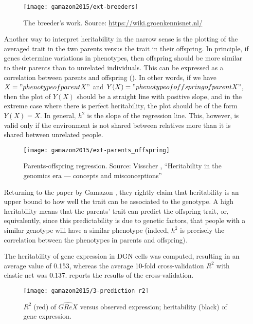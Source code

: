 \documentclass[../main.tex]{subfiles}
\begin{document}
\begin{figure}
	\texttt{[image: gamazon2015/ext-breeders]}
	\caption{The breeder's work. Source: 
\url{https://wiki.groenkennisnet.nl/}}
\end{figure}

Another way to interpret heritability in the narrow sense is the 
plotting of the averaged trait in the two parents versus the trait in 
their offspring. In principle, if genes determine variations in 
phenotypes, then offspring should be more similar to their parents than 
to unrelated individuals. This can be expressed as a correlation between 
parents and offspring (). In other words, if 
we have $X = "phenotype of parent X"$ and $Y(X) = "phenotype of 
offspring of parent X"$, then the plot of $Y(X)$ should be a straight 
line with positive slope, and in the extreme case where there is perfect 
heritability, the plot should be of the form $Y(X) = X$. In general, 
$h^2$ is the slope of the regression line. This, however, is valid only 
if the environment is not shared between relatives more than it is 
shared between unrelated people.

\begin{figure}
	\texttt{[image: gamazon2015/ext-parents\_offspring]}
	\caption{Parents-offspring regression. Source: Visscher , 
\enquote{Heritability in the genomics era — concepts and 
misconceptions}}
\end{figure}

Returning to the paper by Gamazon \etal, they rightly claim that 
heritability is an upper bound to how well the trait can be associated 
to the genotype. A high heritability means that the parents' trait can 
predict the offspring trait, or, equivalently, since this predictability 
is due to genetic factors, that people with a similar genotype will have 
a similar phenotype (indeed, $h^2$ is precisely the correlation between 
the phenotypes in parents and offspring).

The heritability of gene expression in DGN cells was computed, resulting 
in an average value of 0.153, whereas the average 10-fold 
cross-validation $R^2$ with elastic net was 0.137. 
 reports the results of the cross-validation.

\begin{figure}
	\texttt{[image: gamazon2015/3-prediction\_r2]}
	\caption{$R^2$ (red) of $\widehat{GReX}$ versus observed expression; 
heritability (black) of gene expression.}
\end{figure}
\end{document}
